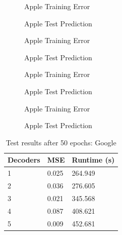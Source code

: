 \documentclass{article}
\begin{document}
    \begin{figure}[H]
      \centering
      \begin{minipage}[b]{0.4	\textwidth}
        \caption{Apple Training Error}
      \end{minipage}
      \hfill
      \begin{minipage}[b]{0.4	\textwidth}
        \caption{Apple Test Prediction}
      \end{minipage}
    \end{figure}
    \begin{figure}[H]
      \centering
      \begin{minipage}[b]{0.4	\textwidth}
        \caption{Apple Training Error}
      \end{minipage}
      \hfill
      \begin{minipage}[b]{0.4	\textwidth}
        \caption{Apple Test Prediction}
      \end{minipage}
    \end{figure}
    \begin{figure}[H]
      \centering
      \begin{minipage}[b]{0.4	\textwidth}
        \caption{Apple Training Error}
      \end{minipage}
      \hfill
      \begin{minipage}[b]{0.4	\textwidth}
        \caption{Apple Test Prediction}
      \end{minipage}
    \end{figure}
    \begin{figure}[H]
      \centering
      \begin{minipage}[b]{0.4	\textwidth}
        \caption{Apple Training Error}
      \end{minipage}
      \hfill
      \begin{minipage}[b]{0.4	\textwidth}
        \caption{Apple Test Prediction}
      \end{minipage}
    \end{figure}
    \begin{table}[H]
      \caption{Test results after 50 epochs: Google}
      \centering
      \begin{tabular}{lll}
        \toprule
        Decoders     & MSE     & Runtime (s) \\
        \midrule
	 1 & 0.025 & 264.949 \\
	 2 & 0.036 & 276.605 \\
	 3 & 0.021 & 345.568 \\
	 4 & 0.087 & 408.621 \\
	 5 & 0.009 & 452.681 \\
      \bottomrule
      \end{tabular}
    \end{table}
\end{document}
